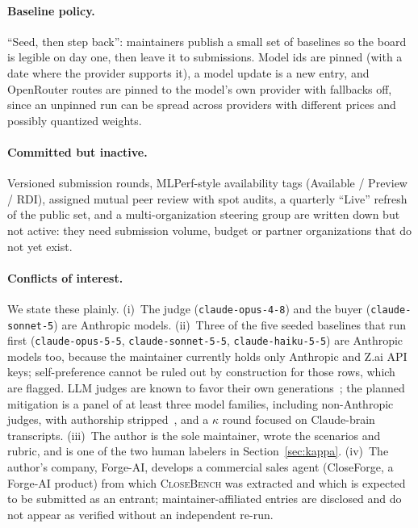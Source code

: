 \documentclass[11pt]{article}
\newcommand{\cb}{\textsc{CloseBench}}
\newcommand{\code}[1]{\texttt{#1}}
\begin{document}
\paragraph{Baseline policy.} ``Seed, then step back'': maintainers publish a small set of baselines so the
board is legible on day one, then leave it to submissions. Model ids are pinned (with a date where the
provider supports it), a model update is a new entry, and OpenRouter routes are pinned to the model's
own provider with fallbacks off, since an unpinned run can be spread across providers with different
prices and possibly quantized weights.

\paragraph{Committed but inactive.} Versioned submission rounds, MLPerf-style availability tags
(Available / Preview / RDI), assigned mutual peer review with spot audits, a quarterly ``Live'' refresh
of the public set, and a multi-organization steering group are written down but not active: they need
submission volume, budget or partner organizations that do not yet exist.

\paragraph{Conflicts of interest.} We state these plainly.
(i)~The judge (\code{claude-opus-4-8}) and the buyer (\code{claude-sonnet-5}) are Anthropic models.
(ii)~Three of the five seeded baselines that run first (\code{claude-opus-5-5}, \code{claude-sonnet-5-5},
\code{claude-haiku-5-5}) are Anthropic models too, because the maintainer currently holds only Anthropic and
Z.ai API keys; self-preference cannot be ruled out by construction for those rows, which are flagged.
LLM judges are known to favor their own generations~\citep{panickssery2024self}; the planned mitigation is a
panel of at least three model families, including non-Anthropic judges, with authorship
stripped~\citep{verga2024juries}, and a $\kappa$ round focused on Claude-brain transcripts.
(iii)~The author is the sole maintainer, wrote the scenarios and rubric, and is one of the two human
labelers in Section~\ref{sec:kappa}. (iv)~The author's company, Forge-AI, develops a commercial sales agent
(CloseForge, a Forge-AI product) from which \cb{} was extracted and which is expected to be submitted as an entrant;
maintainer-affiliated entries are disclosed and do not appear as verified without an independent re-run.
\end{document}
